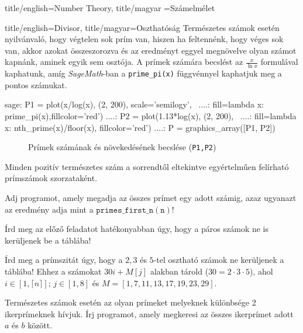 \documentclass{amsbook}
\begin{document}
\begin{Part*}{
    title/english=Number Theory,
    title/magyar =Számelmélet}
\begin{Section}{
    title/english=Divisor,
    title/magyar=Oszthatóság}
  Természetes számok esetén nyilvánvaló, hogy végtelen sok prím van, hiszen ha
  feltennénk, hogy véges sok van, akkor azokat összeszorozva és az eredményt
  eggyel megnövelve olyan számot kapnánk, aminek egyik sem osztója.
  A prímek számára becslést az $\frac{x}{\ln x}$ formulával kaphatunk, amíg
  \emph{SageMath}-ban a \texttt{prime\_pi(x)} függvénnyel kaphatjuk meg a
  pontos számukat.
  \begin{sageexample}
    sage: P1 = plot(x/log(x), (2, 200), scale='semilogy', \
    ....:     fill=lambda x: prime_pi(x),fillcolor='red')
    ....: P2 = plot(1.13*log(x), (2, 200), \
    ....:     fill=lambda x: nth_prime(x)/floor(x), fillcolor='red')
    ....: P = graphics_array([P1, P2])
  \end{sageexample}
  \begin{figure}[ht]
    \centering
    \caption{Prímek számának és növekedésének becslése (\texttt{P1,P2}) }
  \end{figure}

  \begin{theorem} Minden pozitív természetes szám a 
    sorrendtől eltekintve egyértelműen felírható prímszámok szorzataként.
  \end{theorem}

  \begin{exercise} Adj programot, amely megadja az 
    összes prímet egy adott számig, azaz ugyanazt az eredmény adja mint a 
    $\mathtt{primes\_first\_n(n)}$!
  \end{exercise}

  \begin{exercise} Írd meg az előző feladatot hatékonyabban úgy, hogy a páros
    számok ne is kerüljenek be a táblába!
  \end{exercise}

  \begin{exercise} Írd meg a prímszitát úgy, hogy a $2,3$ és $5$-tel osztható
    számok ne kerüljenek a táblába! Ehhez a számokat $30i+M[j]$ alakban tárold
    ($30=2\cdot 3\cdot 5$), ahol $i\in[1,\lceil n\rceil]$; $j\in[1,8]$ és
    $M=[1,7,11,13,17,19,23,29]$.
  \end{exercise}

  \begin{exercise}[Ikerprímek]
      Természetes számok esetén az olyan prímeket melyeknek különbsége 2
      ikerprímeknek hívjuk. Írj programot, amely megkeresi az összes ikerprímet
      adott $a$ és $b$ között.
  \end{exercise}


\end{Section}
\end{Part*}
\end{document}
